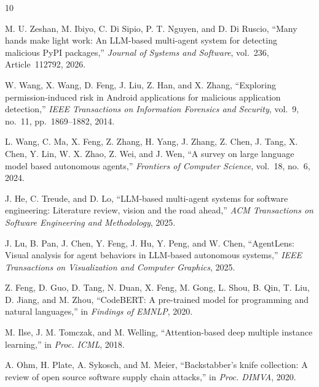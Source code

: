 \documentclass[conference,a4paper]{IEEEtran}
\begin{document}
\balance
\begin{thebibliography}{10}

M. U. Zeshan, M. Ibiyo, C. Di Sipio, P. T. Nguyen, and D. Di Ruscio,
``Many hands make light work: An LLM-based multi-agent system for detecting malicious
PyPI packages,'' \emph{Journal of Systems and Software}, vol.~236, Article~112792, 2026.

W. Wang, X. Wang, D. Feng, J. Liu, Z. Han, and X. Zhang,
``Exploring permission-induced risk in Android applications for malicious application
detection,'' \emph{IEEE Transactions on Information Forensics and Security},
vol.~9, no.~11, pp.~1869--1882, 2014.

L. Wang, C. Ma, X. Feng, Z. Zhang, H. Yang, J. Zhang, Z. Chen, J. Tang, X. Chen,
Y. Lin, W. X. Zhao, Z. Wei, and J. Wen,
``A survey on large language model based autonomous agents,''
\emph{Frontiers of Computer Science}, vol.~18, no.~6, 2024.

J. He, C. Treude, and D. Lo,
``LLM-based multi-agent systems for software engineering: Literature review, vision and
the road ahead,'' \emph{ACM Transactions on Software Engineering and Methodology}, 2025.

J. Lu, B. Pan, J. Chen, Y. Feng, J. Hu, Y. Peng, and W. Chen,
``AgentLens: Visual analysis for agent behaviors in LLM-based autonomous systems,''
\emph{IEEE Transactions on Visualization and Computer Graphics}, 2025.

Z. Feng, D. Guo, D. Tang, N. Duan, X. Feng, M. Gong, L. Shou, B. Qin, T. Liu,
D. Jiang, and M. Zhou,
``CodeBERT: A pre-trained model for programming and natural languages,''
in \emph{Findings of EMNLP}, 2020.

M. Ilse, J. M. Tomczak, and M. Welling,
``Attention-based deep multiple instance learning,'' in \emph{Proc. ICML}, 2018.

A. Ohm, H. Plate, A. Sykosch, and M. Meier,
``Backstabber's knife collection: A review of open source software supply chain
attacks,'' in \emph{Proc. DIMVA}, 2020.

\end{thebibliography}
\end{document}
